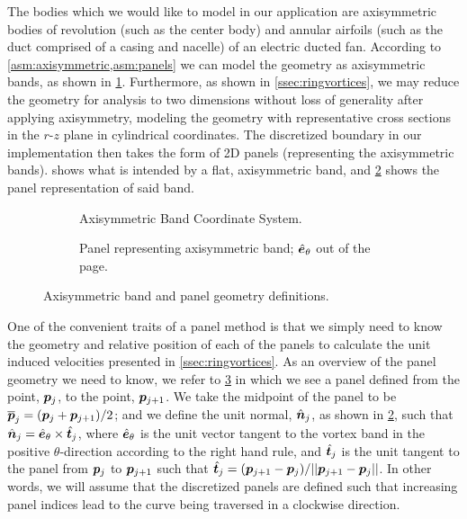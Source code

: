 The bodies which we would like to model in our application are axisymmetric bodies of revolution (such as the center body) and annular airfoils (such as the duct comprised of a casing and nacelle) of an electric ducted fan.
%
According to \cref{asm:axisymmetric,asm:panels} we can model the geometry as axisymmetric bands, as shown in \cref{fig:flatbandgeometry}.
%
Furthermore, as shown in \cref{ssec:ringvortices}, we may reduce the geometry for analysis to two dimensions without loss of generality after applying axisymmetry, modeling the geometry with representative cross sections in the \(r\)-\(z\) plane in cylindrical coordinates.%
%
The discretized boundary in our implementation then takes the form of 2D panels (representing the axisymmetric bands).
%
 shows what is intended by a flat, axisymmetric band, and \cref{fig:flatpanelgeometry} shows the panel representation of said band.

\begin{figure}[htb]
     \centering
     \begin{subfigure}[t]{0.45\textwidth}
         \centering
        
        \caption{Axisymmetric Band Coordinate System.}
        \label{fig:flatbandgeometry}
     \end{subfigure}
     \hfill
     \begin{subfigure}[t]{0.45\textwidth}
         \centering
         \raisebox{2em}{}
        \caption{Panel representing axisymmetric band; \(\hat{\bm{e}}_\theta\) out of the page.}
        \label{fig:flatpanelgeometry}
     \end{subfigure}
    \caption{Axisymmetric band and panel geometry definitions.}
    \label{fig:axisymmetricbandpanelgeometry}
\end{figure}

One of the convenient traits of a panel method is that we simply need to know the geometry and relative position of each of the panels to calculate the unit induced velocities presented in \cref{ssec:ringvortices}.
%
As an overview of the panel geometry we need to know, we refer to \cref{fig:axisymmetricbandpanelgeometry} in which we see a panel defined from the point, {\(\bm{p}_j\)}, to the point, {\(\bm{p}_{j+1}\)}.
%
We take the midpoint of the panel to be \({\overline{\bm{p}}_j}={(\bm{p}_{j}+\bm{p}_{j+1})}/2\); and we define the unit normal, {\(\hat{\bm{n}}_j\)}, as shown in \cref{fig:flatpanelgeometry},
such that \(\hat{\bm{n}}_j=\hat{\bm{e}}_\theta\times\hat{\bm{t}}_j\),
where \(\hat{\bm{e}}_\theta\) is the unit vector tangent to the vortex band in the positive \(\theta\)-direction according to the right hand rule,
and {\(\hat{\bm{t}}_j\)} is the unit tangent to the panel from {\(\bm{p}_j\)} to {\(\bm{p}_{j+1}\)}
such that \(\hat{\bm{t}}_j = (\bm{p}_{j+1}-\bm{p}_j)/||\bm{p}_{j+1}-\bm{p}_j||\).
%
In other words, we will assume that the discretized panels are defined such that increasing panel indices lead to the curve being traversed in a clockwise direction.

